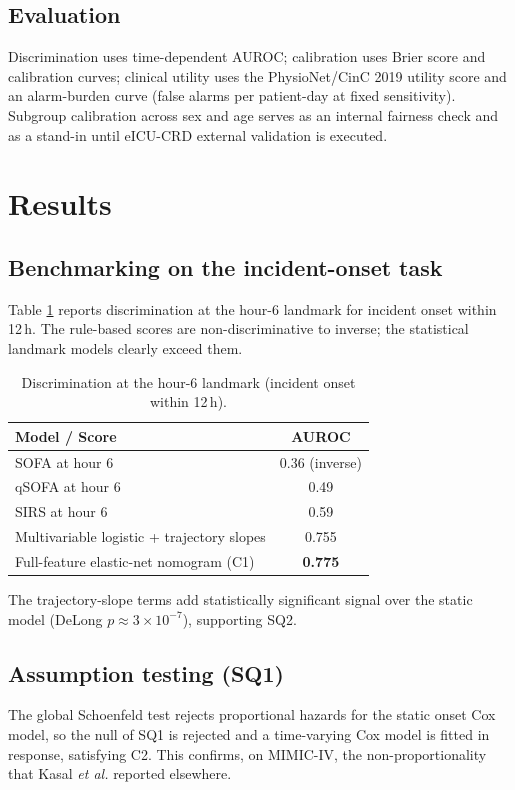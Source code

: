 \documentclass[conference]{IEEEtran}
\begin{document}
\subsection{Evaluation}
Discrimination uses time-dependent AUROC; calibration uses Brier score and
calibration curves; clinical utility uses the PhysioNet/CinC 2019 utility score
\cite{reyna2020physionet} and an alarm-burden curve (false alarms per
patient-day at fixed sensitivity). Subgroup calibration across sex and age
serves as an internal fairness check and as a stand-in until eICU-CRD external
validation is executed.

\section{Results}
\label{sec:results}

\subsection{Benchmarking on the incident-onset task}
Table \ref{tab:bench} reports discrimination at the hour-6 landmark for
incident onset within 12\,h. The rule-based scores are non-discriminative to
inverse; the statistical landmark models clearly exceed them.

\begin{table}[t]
\caption{Discrimination at the hour-6 landmark (incident onset within 12\,h).}
\label{tab:bench}
\centering
\begin{tabular}{lc}
\toprule
\textbf{Model / Score} & \textbf{AUROC} \\
\midrule
SOFA at hour 6                              & 0.36 (inverse) \\
qSOFA at hour 6                             & 0.49 \\
SIRS at hour 6                              & 0.59 \\
Multivariable logistic + trajectory slopes & 0.755 \\
Full-feature elastic-net nomogram (C1)     & \textbf{0.775} \\
\bottomrule
\end{tabular}
\end{table}

The trajectory-slope terms add statistically significant signal over the
static model (DeLong $p \approx 3\times10^{-7}$), supporting SQ2.

\subsection{Assumption testing (SQ1)}
The global Schoenfeld test rejects proportional hazards for the static onset
Cox model, so the null of SQ1 is rejected and a time-varying Cox model is
fitted in response, satisfying C2. This confirms, on MIMIC-IV, the
non-proportionality that Kasal \emph{et al.} \cite{kasal2004cox} reported
elsewhere.
\end{document}
